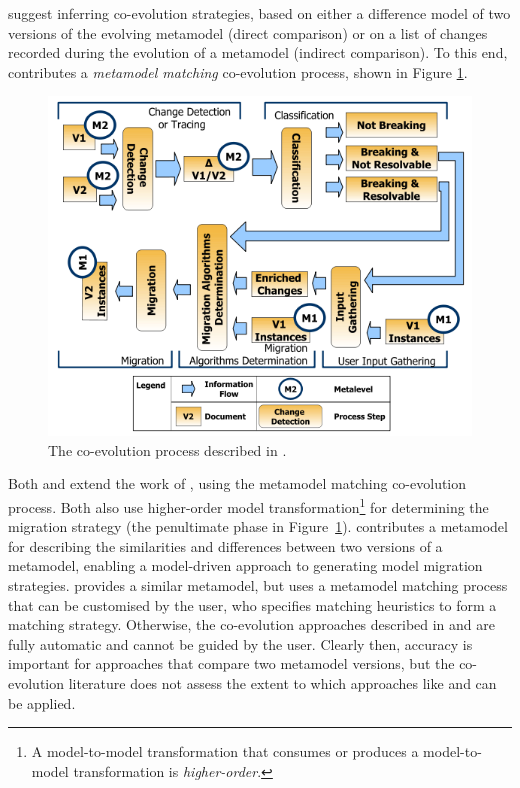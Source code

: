 \cite{gruschko07towards} suggest inferring co-evolution strategies, based on either a difference model of two versions of the evolving metamodel (direct comparison) or on a list of changes recorded during the evolution of a metamodel (indirect comparison). To this end, \cite{gruschko07towards} contributes a \emph{metamodel matching} co-evolution process, shown in Figure \ref{fig:coevoprocess}. 

\begin{figure}[htbp]
  \begin{center}
    \leavevmode
    \includegraphics[scale=0.6]{3.LiteratureReview/images/CoEvoProcess.png}
  \end{center}
  \caption[An exemplar co-evolution process]{The co-evolution process described in \cite{gruschko07towards}.}
  \label{fig:coevoprocess}
\end{figure}

Both \cite{cicchetti08automating} and \cite{garces09managing} extend the work of \cite{gruschko07towards}, using the metamodel matching co-evolution process. Both also use higher-order model transformation\footnote{A model-to-model transformation that consumes or produces a model-to-model transformation is \emph{higher-order}.} for determining the migration strategy (the penultimate phase in Figure~\ref{fig:coevoprocess}). \cite{cicchetti08automating} contributes a metamodel for  describing the similarities and differences between two versions of a metamodel, enabling a model-driven approach to generating model migration strategies. \cite{garces09managing} provides a similar metamodel, but uses a metamodel matching process that can be customised by the user, who specifies matching heuristics to form a matching strategy. Otherwise, the co-evolution approaches described in \cite{cicchetti08automating} and \cite{garces09managing} are fully automatic and cannot be guided by the user. Clearly then, accuracy is important for approaches that compare two metamodel versions, but the co-evolution literature does not assess the extent to which approaches like \cite{cicchetti08automating} and \cite{garces09managing} can be applied.

